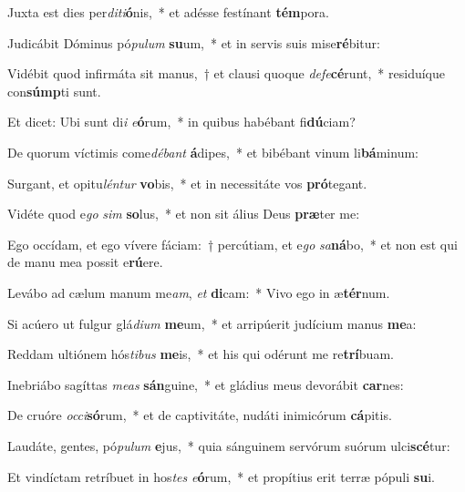 \item Juxta est dies per\textit{di}\textit{ti}\textbf{ó}nis,~* et adésse festínant \textbf{tém}pora.
\item Judicábit Dóminus pó\textit{pu}\textit{lum} \textbf{su}um,~* et in servis suis mise\textbf{ré}bitur:
\item Vidébit quod infirmáta sit manus,~† et clausi quoque \textit{de}\textit{fe}\textbf{cé}runt,~* residuíque con\textbf{súmp}ti sunt.
\item Et dicet: Ubi sunt di\textit{i} \textit{e}\textbf{ó}rum,~* in quibus habébant fi\textbf{dú}ciam?
\item De quorum víctimis come\textit{dé}\textit{bant} \textbf{á}dipes,~* et bibébant vinum li\textbf{bá}minum:
\item Surgant, et opitu\textit{lén}\textit{tur} \textbf{vo}bis,~* et in necessitáte vos \textbf{pró}tegant.
\item Vidéte quod e\textit{go} \textit{sim} \textbf{so}lus,~* et non sit álius Deus \textbf{præ}ter me:
\item Ego occídam, et ego vívere fáciam:~† percútiam, et e\textit{go} \textit{sa}\textbf{ná}bo,~* et non est qui de manu mea possit e\textbf{rú}ere.
\item Levábo ad cælum manum me\textit{am}, \textit{et} \textbf{di}cam:~* Vivo ego in æ\textbf{tér}num.
\item Si acúero ut fulgur glá\textit{di}\textit{um} \textbf{me}um,~* et arripúerit judícium manus \textbf{me}a:
\item Reddam ultiónem hós\textit{ti}\textit{bus} \textbf{me}is,~* et his qui odérunt me re\textbf{trí}buam.
\item Inebriábo sagíttas \textit{me}\textit{as} \textbf{sán}guine,~* et gládius meus devorábit \textbf{car}nes:
\item De cruóre \textit{oc}\textit{ci}\textbf{só}rum,~* et de captivitáte, nudáti inimicórum \textbf{cá}pitis.
\item Laudáte, gentes, pó\textit{pu}\textit{lum} \textbf{e}jus,~* quia sánguinem servórum suórum ulci\textbf{scé}tur:
\item Et vindíctam retríbuet in hos\textit{tes} \textit{e}\textbf{ó}rum,~* et propítius erit terræ pópuli \textbf{su}i.
